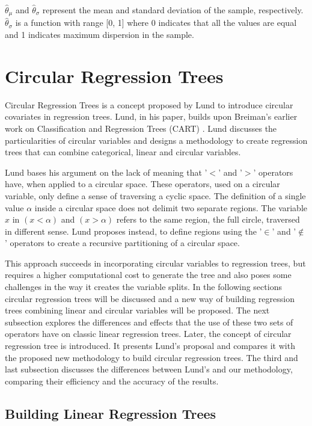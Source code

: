 \documentclass[times,twocolumn,final,authoryear]{elsarticle}
\begin{document}
$ \hat{\theta}_{\mu} $ and $ \hat{\theta}_{\sigma} $ represent the mean and standard deviation of the sample, respectively. $ \hat{\theta}_{\sigma} $ is a function with range [0, 1] where 0 indicates that all the values are equal and 1 indicates maximum dispersion in the sample.


\section{Circular Regression Trees}

Circular Regression Trees is a concept proposed by Lund \citep{Lund2002} to introduce circular covariates in regression trees. Lund, in his paper, builds upon Breiman's earlier work on Classification and Regression Trees (CART) \citep{Breimanetal1984}. Lund discusses the particularities of circular variables and designs a methodology to create regression trees that can combine categorical, linear and circular variables.

Lund bases his argument on the lack of meaning that '$<$' and '$>$' operators have, when applied to a circular space. These operators, used on a circular variable, only define a sense of traversing a cyclic space. The definition of a single value $\alpha$ inside a circular space does not delimit two separate regions. The variable $x$ in $(x < \alpha)$ and $(x > \alpha)$ refers to the same region, the full circle, traversed in different sense. Lund proposes instead, to define regions using the '$\in$' and '$\notin$' operators to create a recursive partitioning of a circular space. 

This approach succeeds in incorporating circular variables to regression trees, but requires a higher computational cost to generate the tree and also poses some challenges in the way it creates the variable splits. In the following sections circular regression trees will be discussed and a new way of building regression trees combining linear and circular variables will be proposed. The next subsection explores the differences and effects that the use of these two sets of operators have on classic linear regression trees. Later, the concept of circular regression tree is introduced. It presents Lund's proposal and compares it with the proposed new methodology to build circular regression trees. The third and last subsection discusses the differences between Lund's and our methodology, comparing their efficiency and the accuracy of the results.

\subsection{Building Linear Regression Trees}
\end{document}
